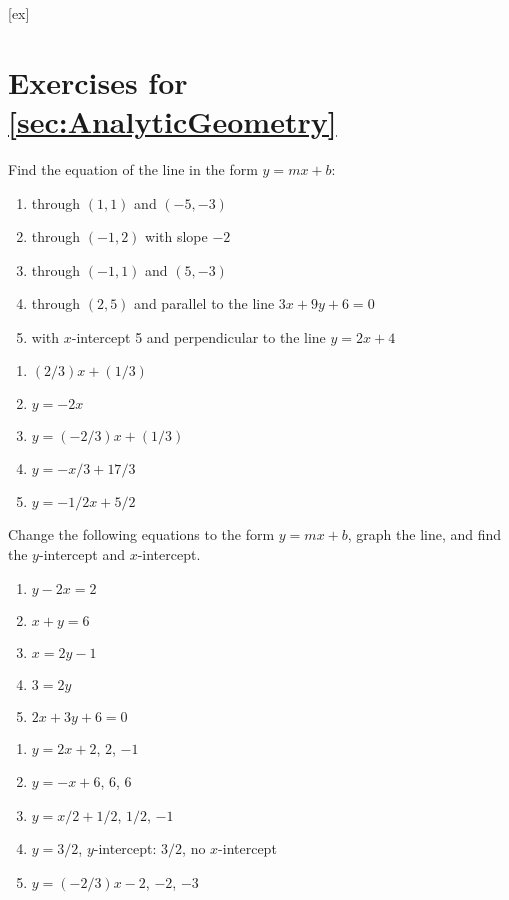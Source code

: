 



		

[ex]
\section*{Exercises for \ref{sec:AnalyticGeometry}}

\begin{enumialphparenastyle}

\begin{multicols}{2}
\begin{ex}
Find the equation of the line in the form $y=mx+b$:
\begin{enumerate}
	\item	through $(1,1)$ and $(-5, -3)$
	\item	through $(-1,2)$ with slope $-2$
	\item	through $(-1,1)$ and $(5, -3)$
	\item	through $(2,5)$ and parallel to the line $3x+9y+6=0$
	\item	with $x$-intercept 5 and perpendicular to the line $y=2x+4$
\end{enumerate}
\begin{sol}
\begin{enumerate}
	\item	$(2/3)x+(1/3)$
	\item	$y=-2x$
	\item	$y=(-2/3)x+(1/3)$
	\item	$y=-x/3+17/3$
	\item	$y=-1/2x+5/2$
\end{enumerate}
\end{sol}
\end{ex}

\begin{ex}
Change the following equations to the form $y=mx+b$, graph the
line, and find the $y$-intercept and $x$-intercept.
\begin{enumerate}
	\item	$y-2x=2$
	\item	$x+y=6$
	\item	$x=2y-1$
	\item	$3=2y$
	\item	$2x+3y+6=0$
\end{enumerate}
\begin{sol}
\begin{enumerate}
	\item	$y=2x+2$, $2$, $-1$
	\item	$y=-x+6$, $6$, $6$
	\item	$y=x/2+1/2$, $1/2$, $-1$
	\item	$y=3/2$, $y$-intercept: $3/2$, no $x$-intercept
	\item	$y=(-2/3)x-2$, $-2$, $-3$
\end{enumerate}
\end{sol}
\end{ex}
 

\end{multicols}
\end{enumialphparenastyle}
